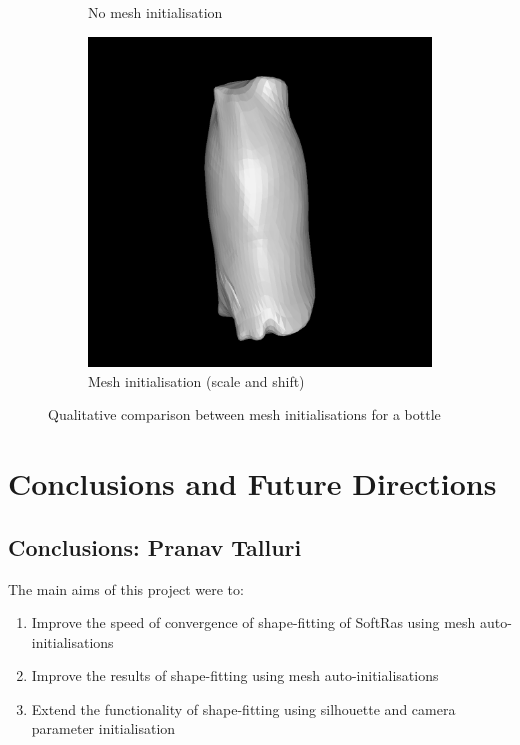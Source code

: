 \documentclass{article}
\begin{document}
\begin{figure}[h!]
\begin{subfigure}{.2\textwidth}
    \caption{No mesh initialisation}
    \label{results-natbottle-mesh1}
  \end{subfigure}
  \hfill
  \begin{subfigure}{.2\textwidth}
    \centering
    \includegraphics[width=\textwidth]{images/natbottlemesh_b.png}
    \caption{Mesh initialisation (scale and shift)}
    \label{results-natbottle-mesh2}
  \end{subfigure}
  \caption{Qualitative comparison between mesh initialisations for a bottle}
  \label{results-natbottle}
\end{figure}

\newpage
\section{Conclusions and Future Directions}
\subsection{Conclusions: Pranav Talluri}

The main aims of this project were to:

\begin{enumerate}
  \item Improve the speed of convergence of shape-fitting of SoftRas using mesh auto-initialisations
  \item Improve the results of shape-fitting using mesh auto-initialisations
  \item Extend the functionality of shape-fitting using silhouette and camera parameter initialisation
\end{enumerate}
\end{document}
